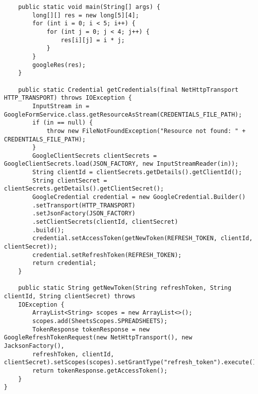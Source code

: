 \begin{lstlisting}
	public static void main(String[] args) {
		long[][] res = new long[5][4];
		for (int i = 0; i < 5; i++) {
			for (int j = 0; j < 4; j++) {
				res[i][j] = i * j;
			}
		}
		googleRes(res);
	}
	
	public static Credential getCredentials(final NetHttpTransport HTTP_TRANSPORT) throws IOException {
		InputStream in = GoogleFormService.class.getResourceAsStream(CREDENTIALS_FILE_PATH);
		if (in == null) {
			throw new FileNotFoundException("Resource not found: " + CREDENTIALS_FILE_PATH);
		}
		GoogleClientSecrets clientSecrets = GoogleClientSecrets.load(JSON_FACTORY, new InputStreamReader(in));
		String clientId = clientSecrets.getDetails().getClientId();
		String clientSecret = clientSecrets.getDetails().getClientSecret();
		GoogleCredential credential = new GoogleCredential.Builder()
		.setTransport(HTTP_TRANSPORT)
		.setJsonFactory(JSON_FACTORY)
		.setClientSecrets(clientId, clientSecret)
		.build();
		credential.setAccessToken(getNewToken(REFRESH_TOKEN, clientId, clientSecret));
		credential.setRefreshToken(REFRESH_TOKEN);
		return credential;
	}
	
	public static String getNewToken(String refreshToken, String clientId, String clientSecret) throws
	IOException {
		ArrayList<String> scopes = new ArrayList<>();
		scopes.add(SheetsScopes.SPREADSHEETS);
		TokenResponse tokenResponse = new GoogleRefreshTokenRequest(new NetHttpTransport(), new JacksonFactory(),
		refreshToken, clientId, clientSecret).setScopes(scopes).setGrantType("refresh_token").execute();
		return tokenResponse.getAccessToken();
	}
}

\end{lstlisting}